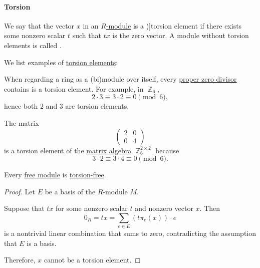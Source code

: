 \paragraph{Torsion}

\begin{definition}\label{def:module_torsion}
  We say that the vector \( x \) in an \hyperref[def:module]{\( R \)-module} is a \term[ru=элемент кручения (\cite[57]{Шафаревич2019ОсновныеПонятияАлгебры})]{torsion element} if there exists some nonzero scalar \( t \) such that \( tx \) is the zero vector. A module without torsion elements is called .
\end{definition}

\begin{example}\label{ex:def:module_torsion}
  We list examples of \hyperref[def:module_torsion]{torsion elements}:
  \begin{thmenum}
     When regarding a ring as a (bi)module over itself, every \hyperref[def:semiring_divisibility/zero]{proper zero divisor} contains is a torsion element. For example, in \( \BbbZ_6 \),
    \begin{equation*}
      2 \cdot 3 \equiv 3 \cdot 2 \equiv 0 \pmod 6,
    \end{equation*}
    hence both \( 2 \) and \( 3 \) are torsion elements.

     The matrix
    \begin{equation*}
      \begin{pmatrix}
        2 & 0 \\
        0 & 4
      \end{pmatrix}
    \end{equation*}
    is a torsion element of the \hyperref[thm:matrix_algebra]{matrix algebra} \( \BbbZ_6^{2 \times 2} \) because
    \begin{equation*}
      3 \cdot 2 \equiv 3 \cdot 4 \equiv 0 \pmod 6.
    \end{equation*}
  \end{thmenum}
\end{example}

\begin{proposition}\label{thm:basis_implies_torsion_free}
  Every \hyperref[def:free_semimodule]{free module} is \hyperref[def:module_torsion]{torsion-free}.
\end{proposition}
\begin{proof}
  Let \( E \) be a basis of the \( R \)-module \( M \).

  Suppose that \( tx \) for some nonzero scalar \( t \) and nonzero vector \( x \). Then
  \begin{equation*}
    0_R = tx = \sum_{e \in E} (t \pi_e(x)) \cdot e
  \end{equation*}
  is a nontrivial linear combination that sums to zero, contradicting the assumption that \( E \) is a basis.

  Therefore, \( x \) cannot be a torsion element.
\end{proof}

